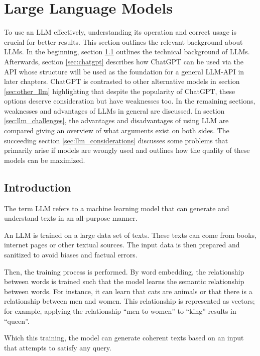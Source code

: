 \section{Large Language Models}\label{sec:llm}

To use an \ac{LLM} effectively, understanding its operation and correct usage is crucial for better results. This section outlines the relevant background about \acp{LLM}. In the beginning, section \ref{sec:llm_introduction} outlines the technical background of \acp{LLM}. Afterwards, section  \ref{sec:chatgpt}  describes how ChatGPT can be used via the \ac{API} whose structure will be used as the foundation for a general \ac{LLM}-\ac{API} in later chapters. ChatGPT is contrasted to other alternative models in section \ref{sec:other_llm} highlighting that despite the popularity of ChatGPT, these options deserve consideration but have weaknesses too. In the remaining sections, weaknesses and advantages of \acp{LLM} in general are discussed. In section \ref{sec:llm_challenges}, the advantages and disadvantages of using \ac{LLM} are compared giving an overview of what arguments exist on both sides. The succeeding section \ref{sec:llm_considerations} discusses some problems that primarily arise if models are wrongly used and outlines how the quality of these models can be maximized. 


\subsection{Introduction}\label{sec:llm_introduction}
The term \ac{LLM} refers to a machine learning model that can generate and understand texts in an all-purpose manner. 

An \ac{LLM} is trained on a large data set of texts. These texts can come from books, internet pages or other textual sources. The input data is then prepared and sanitized to avoid biases and factual errors.


Then, the training process is performed. By word embedding, the relationship between words is trained such that the model learns the semantic relationship between words. For instance, it can learn that cats are animals  or that there is a relationship between men and women. This relationship is represented as vectors; for example, applying the relationship \enquote{men to women} to \enquote{king} results in \enquote{queen}.

Which this training, the model can generate coherent texts based on an input that attempts to satisfy any query.


